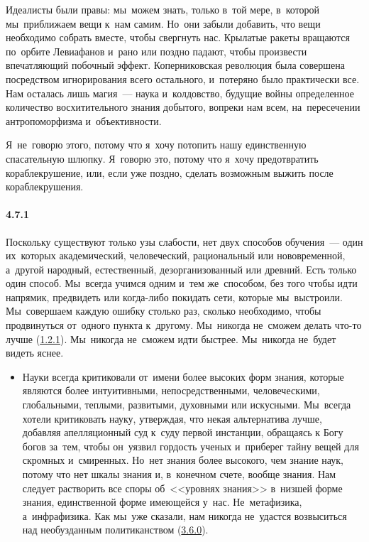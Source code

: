 \begin{itemize}
	Идеалисты были правы: мы~можем знать, только в~той мере, в~которой мы~приближаем вещи к~нам самим. Но~они забыли добавить, что вещи необходимо собрать вместе, чтобы свергнуть нас. Крылатые ракеты вращаются по~орбите Левиафанов и~рано или поздно падают, чтобы произвести впечатляющий побочный эффект. Коперниковская революция была совершена посредством игнорирования всего остального, и~потеряно было практически все. Нам осталась лишь магия~--- наука и~колдовство, будущие войны определенное количество восхитительного знания добытого, вопреки нам всем, на~пересечении антропоморфизма и~объективности.

 Я~не~говорю этого, потому что я~хочу потопить нашу единственную спасательную шлюпку. Я~говорю это, потому что я~хочу предотвратить кораблекрушение, или, если уже поздно, сделать возможным выжить после кораблекрушения.
	\end{itemize}	



\paragraph{4.7.1}\hypertarget{par:4.7.1}{} Поскольку существуют только узы слабости, нет двух способов обучения~--- один их~которых академический, человеческий, рациональный или нововременной, а~другой народный, естественный, дезорганизованный или древний. Есть только один способ. Мы~всегда учимся одним и~тем же~способом, без того чтобы идти напрямик, предвидеть или когда-либо покидать сети, которые мы~выстроили. Мы~совершаем каждую ошибку столько раз, сколько необходимо, чтобы продвинуться от~одного пункта к~другому. Мы~никогда не~сможем делать что-то лучше (\hyperlink{par:1.2.1}{1.2.1}). 
 Мы~никогда не~сможем идти быстрее. Мы~никогда не~будет видеть яснее. 

	\begin{itemize}
	\item 
	Науки всегда критиковали от~имени более высоких форм знания, которые являются более интуитивными, непосредственными, человеческими, глобальными, теплыми, развитыми, духовными или искусными. Мы~всегда хотели критиковать науку, утверждая, что некая альтернатива лучше, добавляя апелляционный суд к~суду первой инстанции, обращаясь к Богу богов за~тем, чтобы он~уязвил гордость ученых и~приберег тайну вещей для скромных и~смиренных. Но~нет знания более высокого, чем знание наук, потому что нет шкалы знания и, в~конечном счете, вообще знания. Нам следует растворить все споры об~<<уровнях знания>> в~низшей форме знания, единственной форме имеющейся у~нас. Не~метафизика, а~инфрафизика. Как мы~уже сказали, нам никогда не~удастся возвыситься над необузданным политиканством (\hyperlink{par:3.6.0}{3.6.0}).
	\end{itemize}	


